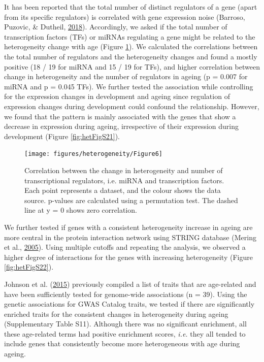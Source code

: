 \documentclass[12pt,twoside]{unicam}
\begin{document}
It has been reported that the total number of distinct regulators of a gene (apart from its specific regulators) is correlated with gene expression noise (Barroso, Puzovic, \& Dutheil, \protect\hyperlink{ref-Barroso2018}{2018}). Accordingly, we asked if the total number of transcription factors (TFs) or miRNAs regulating a gene might be related to the heterogeneity change with age (Figure \ref{fig:hetFig6}). We calculated the correlations between the total number of regulators and the heterogeneity changes and found a mostly positive (18 / 19 for miRNA and 15 / 19 for TFs), and higher correlation between change in heterogeneity and the number of regulators in ageing (p = 0.007 for miRNA and p = 0.045 TFs). We further tested the association while controlling for the expression changes in development and ageing since regulation of expression changes during development could confound the relationship. However, we found that the pattern is mainly associated with the genes that show a decrease in expression during ageing, irrespective of their expression during development (Figure \ref{fig:hetFigS21}).

\begin{figure}

{\centering \texttt{[image: figures/heterogeneity/Figure6]} 

}

\caption[Correlation between the change in heterogeneity and number of transcriptional regulators.]{Correlation between the change in heterogeneity and number of transcriptional regulators, i.e. miRNA and transcription factors. Each point represents a dataset, and the colour shows the data source. p-values are calculated using a permutation test. The dashed line at y = 0 shows zero correlation.}\label{fig:hetFig6}
\end{figure}

We further tested if genes with a consistent heterogeneity increase in ageing are more central in the protein interaction network using STRING database (Mering et al., \protect\hyperlink{ref-VonMering2005}{2005}). Using multiple cutoffs and repeating the analysis, we observed a higher degree of interactions for the genes with increasing heterogeneity (Figure \ref{fig:hetFigS22}).

Johnson et al. (\protect\hyperlink{ref-Johnson2015}{2015}) previously compiled a list of traits that are age-related and have been sufficiently tested for genome-wide associations (n = 39). Using the genetic associations for GWAS Catalog traits, we tested if there are significantly enriched traits for the consistent changes in heterogeneity during ageing (Supplementary Table S11). Although there was no significant enrichment, all these age-related terms had positive enrichment scores, \emph{i.e.} they all tended to include genes that consistently become more heterogeneous with age during ageing.
\end{document}

